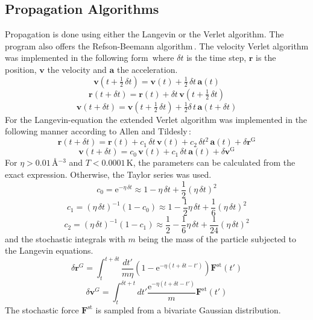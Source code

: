 \documentclass[twoside, 11pt, titlepage, captions=nooneline, a4paper, headsepline]{scrbook}%
\newcommand{\9}{\mathrm}
\newcommand{\0}{\,\mathrm}
\begin{document}
\subsection{Propagation Algorithms}
Propagation is done using either the Langevin or the Verlet algorithm. The program also offers the Refson-Beemann algorithm\,\cite{refson1985}. The velocity Verlet algorithm was implemented in the following form\,\cite{allen1989} where $\delta t$ is the time step, $\mathbf{r}$ is the position, $\mathbf{v}$ the velocity and $\mathbf{a}$ the acceleration. 
\begin{equation}\label{Eq:Verlet_v1}
\mathbf{v}(t+\tfrac{1}{2}\,\delta t)=\mathbf{v}(t)+\tfrac{1}{2}\,\delta t \,\mathbf{a}(t)
\end{equation}
\begin{equation}\label{Eq:Verlet_r1}
\mathbf{r}(t+\delta t)=\mathbf{r}(t)+\delta t\, \mathbf{v}(t+\tfrac{1}{2}\,\delta t)
\end{equation}
\begin{equation}\label{Eq:Verlet_v2}
\mathbf{v}(t+\delta t)=\mathbf{v}(t+\tfrac{1}{2}\,\delta t)+ \tfrac{1}{2}\delta\, t\,\mathbf{a}(t+\delta t)
\end{equation}
For the Langevin-equation the extended Verlet algorithm was implemented in the following manner according to Allen and Tildesly\,\cite{allen1989}:
\begin{equation}\label{Eq:Langevin_r}
\mathbf{r}(t+\delta t)=\mathbf{r}(t)+c_1\,\delta t\,\mathbf{v}(t)+c_2\,\delta t^2\,\mathbf{a}(t)+\delta\mathbf{r}^\mathrm{G}
\end{equation}
\begin{equation}\label{Eq:Langevin_v}
\mathbf{v}(t+\delta t)=c_0\,\mathbf{v}(t)+c_1\,\delta t\,\mathbf{a}(t)+\delta\mathbf{v}^\mathrm{G}
\end{equation}
For $\eta>0.01$\,\AA$^{-3}$ and $T<0.0001$\,K, the parameters can be calculated from the exact expression. Otherwise, the Taylor series was used.
\begin{equation}
c_0=\mathrm{e}^{-\eta\,\delta t}\approx 1-\eta\,\delta t+\frac{1}{2} (\eta\,\delta t)^2
\end{equation}
\begin{equation}
c_1=(\eta\,\delta t)^{-1}(1-c_0)\approx 1-\frac{1}{2}\eta\,\delta t+\frac{1}{6}(\eta\,\delta t)^2
\end{equation}
\begin{equation}
c_2=(\eta\,\delta t)^{-1}(1-c_1)\approx \frac{1}{2}-\frac{1}{6}\eta\,\delta t+\frac{1}{24}(\eta\,\delta t)^2
\end{equation}
and the stochastic integrals with $m$ being the mass of the particle subjected to the Langevin equations.
\begin{equation}
\delta \mathbf{r}^G=\int_t^{t+\delta t} \frac{dt'}{m \eta}(1-\mathrm{e}^{-\eta(t+\delta t-t')})\mathbf{F}^\mathrm{st}(t')
\end{equation}
\begin{equation}
\delta \mathbf{v}^G=\int_t^{\delta t+t} dt' \frac{\mathrm{e}^{-\eta(t+\delta t-t')}}{m}\mathbf{F}^\mathrm{st}(t')
\end{equation}
The stochastic force $\mathbf{F}^\mathrm{st}$ is sampled from a bivariate Gaussian distribution.
\end{document}

